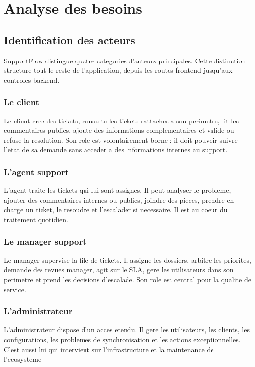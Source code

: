 ﻿\chapter{Analyse des besoins}

\section{Identification des acteurs}

SupportFlow distingue quatre categories d'acteurs principales. Cette distinction structure tout le reste de l'application, depuis les routes frontend jusqu'aux controles backend.

\subsection{Le client}

Le client cree des tickets, consulte les tickets rattaches a son perimetre, lit les commentaires publics, ajoute des informations complementaires et valide ou refuse la resolution. Son role est volontairement borne : il doit pouvoir suivre l'etat de sa demande sans acceder a des informations internes au support.

\subsection{L'agent support}

L'agent traite les tickets qui lui sont assignes. Il peut analyser le probleme, ajouter des commentaires internes ou publics, joindre des pieces, prendre en charge un ticket, le resoudre et l'escalader si necessaire. Il est au coeur du traitement quotidien.

\subsection{Le manager support}

Le manager supervise la file de tickets. Il assigne les dossiers, arbitre les priorites, demande des revues manager, agit sur le SLA, gere les utilisateurs dans son perimetre et prend les decisions d'escalade. Son role est central pour la qualite de service.

\subsection{L'administrateur}

L'administrateur dispose d'un acces etendu. Il gere les utilisateurs, les clients, les configurations, les problemes de synchronisation et les actions exceptionnelles. C'est aussi lui qui intervient sur l'infrastructure et la maintenance de l'ecosysteme.

